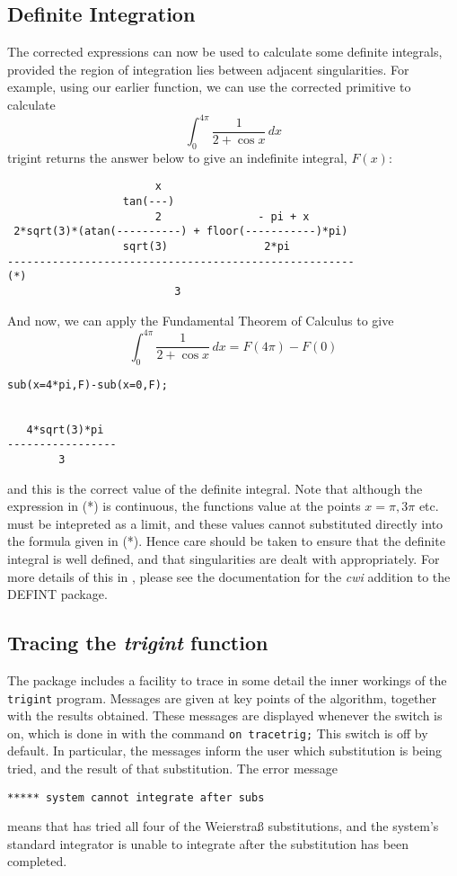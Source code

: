 \subsection{Definite Integration}
The corrected expressions can now be used to calculate some definite integrals, provided the region of integration lies between adjacent singularities. For example, using our earlier function, we can use the corrected primitive to calculate
     \begin{equation} \int_{0}^{4\pi} \frac{1}{2+\cos x}\,dx \end{equation}
trigint returns the answer below to give an indefinite integral, $F(x)$:
\begin{verbatim}
                       x
                  tan(---)
                       2               - pi + x
 2*sqrt(3)*(atan(----------) + floor(-----------)*pi)
                  sqrt(3)               2*pi
------------------------------------------------------                   (*)
                          3
\end{verbatim}
And now, we can apply the Fundamental Theorem of Calculus to give
 \begin{equation} \int_{0}^{4\pi} \frac{1}{2+\cos x}\,dx = F(4\pi)-F(0) \end{equation}
\begin{verbatim}
sub(x=4*pi,F)-sub(x=0,F);


   4*sqrt(3)*pi
-----------------
        3
\end{verbatim}
and this is the correct value of the definite integral.
Note that although the expression in (*) is continuous, the functions value at the points $x=\pi,3\pi$ etc. must be intepreted as a limit, and these values cannot substituted directly into the formula given in (*). Hence care should be taken to ensure that the definite integral is well defined, and that singularities are dealt with appropriately. For more details of this in \REDUCE, please see the documentation for the \emph{cwi} addition to the \textsc{DEFINT} package.

\subsection{Tracing the \emph{trigint} function}

\hypertarget{switch:TRACETRIG}{}%
The package includes a facility to trace in some detail the inner workings of the \texttt{trigint} program. Messages are given at key points of the algorithm, together with the results obtained. These messages are displayed whenever the switch  is on, which is done in \REDUCE with the
command \texttt{on tracetrig;}
This switch is off by default. In particular, the messages inform the user which substitution is being tried, and the result of that substitution. The error message
\begin{verbatim}
***** system cannot integrate after subs
\end{verbatim}
means that \REDUCE has tried all four of the Weierstra\ss{} substitutions, and the system's standard integrator is unable to integrate after the substitution has been completed.

